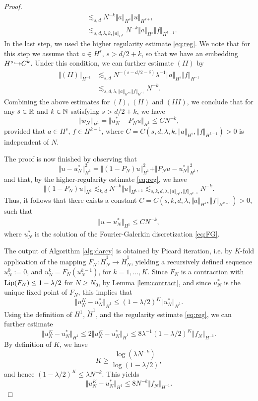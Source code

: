 \documentclass[reqno,a4paper]{amsart}
\begin{document}
\begin{proof}
\begin{align*}
&\lesssim_{s,d}
N^{-k} \Vert a \Vert_{H^s}  \Vert u \Vert_{H^{k+1}}
\\
&\lesssim_{s,d,\lambda,k,\Vert a \Vert_{C^k}}
N^{-k} \Vert a \Vert_{H^s} \Vert f \Vert_{H^{k-1}}.
\end{align*}
In the last step, we used the higher regularity estimate \eqref{eq:reg}. We note that for this step we assume that $a \in H^s$, $s>d/2+k$, so that we have an embedding $H^s {\hookrightarrow} C^k$. Under this condition, we can further estimate $(II)$ by
\begin{align*}
\Vert (II) \Vert_{H^{-1}}
&\lesssim_{s,d}
N^{-(s-d/2-\delta)} \lambda^{-1} \Vert a \Vert_{H^s} \Vert f \Vert_{H^{-1}}
\\
&\lesssim_{s,d,\lambda, \Vert a \Vert_{H^s}, \Vert f \Vert_{H^{-1}}} N^{-k}.
\end{align*}
Combining the above estimates for $(I)$, $(II)$ and $(III)$, we conclude that for any $s\in \mathbb{R}$ and $k\in \mathbb{N}$ satisfying $s>d/2+k$, we have
\[
\Vert w_N \Vert_{H^1}
=
\Vert 
u_N^\ast - P_N u
\Vert_{H^{1}}
\le C N^{-k},
\]
provided that $a\in H^s$, $f \in H^{k-1}$, where $C = C\left(s,d,\lambda,k,\Vert a \Vert_{H^s}, \Vert f \Vert_{H^{k-1}}\right)>0$ is independent of $N$. 

The proof is now finished by observing that 
\[
\Vert u - u_N^\ast \Vert_{H^1}^2
=
\Vert (1-P_N) u \Vert_{H^1}^2
+
\Vert P_N u - u_N^\ast \Vert_{H^1}^2,
\]
and that, by the higher-regularity estimate \eqref{eq:reg}, we have
\[ 
\Vert (1-P_N) u \Vert_{H^1}
\lesssim_{k,d}
N^{-k} \Vert u \Vert_{H^{k+1}}
\lesssim_{s,k,d,\lambda,\Vert a\Vert_{H^s}, \Vert f \Vert_{H^{k-1}}}
N^{-k}.
\]
Thus, it follows that there exists a constant $C = C(s,k,d,\lambda,\Vert a\Vert_{H^s}, \Vert f \Vert_{H^{k-1}})>0$, such that 
\begin{align} \label{eq:FGexact}
\Vert u - u_N^\ast \Vert_{H^1}
\le
C N^{-k},
\end{align}
where $u^\ast_N$ is the solution of the Fourier-Galerkin discretization \eqref{eq:FG}.


The output of Algorithm \ref{alg:darcy} is obtained by Picard iteration, i.e. by $K$-fold application of the mapping $F_N: \dot{H}^1_N \to \dot{H}^1_N$, yielding a recursively defined sequence $u^0_N := 0$, and $u^k_N = F_N(u^{k-1}_N)$, for $k=1,\dots, K$. Since $F_N$ is a contraction with $\mathrm{Lip}(F_N) \le 1-\lambda/2$ for $N\ge N_0$, by Lemma \ref{lem:contract}, and since $u^\ast_N$ is the unique fixed point of $F_N$, this implies that
\[
\Vert 
u^K_N - u^\ast_N
\Vert_{\dot{H}^1}
\le
(1-\lambda/2)^K \Vert u^\ast_N \Vert_{\dot{H}^1}.
\]
Using the definition of $H^1$, $\dot{H}^1$, and the regularity estimate \eqref{eq:reg}, we can further estimate
\[
\Vert 
u^K_N - u^\ast_N
\Vert_{{H}^1}
\le
2
\Vert 
u^K_N - u^\ast_N
\Vert_{\dot{H}^1}
\le
8\lambda^{-1}(1-\lambda/2)^K \Vert f_N \Vert_{H^{-1}}.
\]
By definition of $K$, we have
\[
K \ge \frac{\log(\lambda N^{-k})}{\log(1-\lambda/2)},
\]
and hence $(1-\lambda/2)^K \le \lambda N^{-k}$. This yields
\[
\Vert 
u^K_N - u^\ast_N
\Vert_{{H}^1}
\le
8 N^{-k}\Vert f_N \Vert_{H^{-1}}.
\]


\end{proof}
\end{document}

